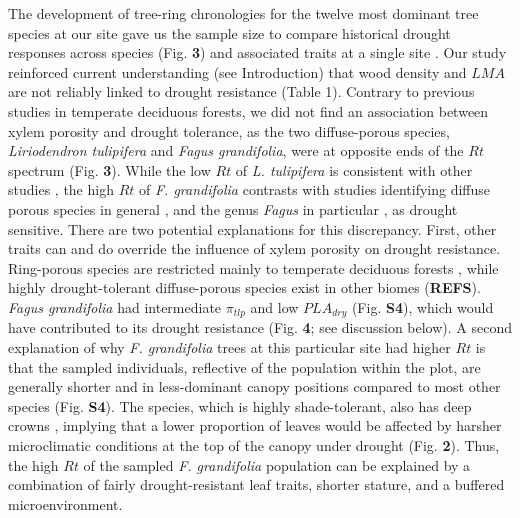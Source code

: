 \documentclass[
]{article}
\begin{document}
The development of tree-ring chronologies for the twelve most dominant
tree species at our site
\citep{helcoski_growing_2019, bourg_initial_2013} gave us the sample
size to compare historical drought responses across species (Fig.
\textbf{3}) and associated traits at a single site \citep[see
also][]{elliott_forest_2015}. Our study reinforced current understanding
(see Introduction) that wood density and \(LMA\) are not reliably linked
to drought resistance (Table 1). Contrary to previous studies in
temperate deciduous forests, we did not find an association between
xylem porosity and drought tolerance, as the two diffuse-porous species,
\emph{Liriodendron tulipifera} and \emph{Fagus grandifolia}, were at
opposite ends of the \(Rt\) spectrum (Fig. \textbf{3}). While the low
\(Rt\) of \emph{L. tulipifera} is consistent with other studies
\citep{elliott_forest_2015}, the high \(Rt\) of \emph{F. grandifolia}
contrasts with studies identifying diffuse porous species in general
\citep{elliott_forest_2015, kannenberg_linking_2019}, and the genus
\emph{Fagus} in particular \citep{friedrichs_species-specific_2009}, as
drought sensitive. There are two potential explanations for this
discrepancy. First, other traits can and do override the influence of
xylem porosity on drought resistance. Ring-porous species are restricted
mainly to temperate deciduous forests \citep{wheeler_variations_2007},
while highly drought-tolerant diffuse-porous species exist in other
biomes (\textbf{REFS}). \emph{Fagus grandifolia} had intermediate
\(\pi_{tlp}\) and low \(PLA_{dry}\) (Fig. \textbf{S4}), which would have
contributed to its drought resistance (Fig. \textbf{4}; see discussion
below). A second explanation of why \emph{F. grandifolia} trees at this
particular site had higher \(Rt\) is that the sampled individuals,
reflective of the population within the plot, are generally shorter and
in less-dominant canopy positions compared to most other species (Fig.
\textbf{S4}). The species, which is highly shade-tolerant, also has deep
crowns \citep{andersonteixeira_size-related_2015}, implying that a lower
proportion of leaves would be affected by harsher microclimatic
conditions at the top of the canopy under drought (Fig. \textbf{2}).
Thus, the high \(Rt\) of the sampled \emph{F. grandifolia} population
can be explained by a combination of fairly drought-resistant leaf
traits, shorter stature, and a buffered microenvironment.
\end{document}
